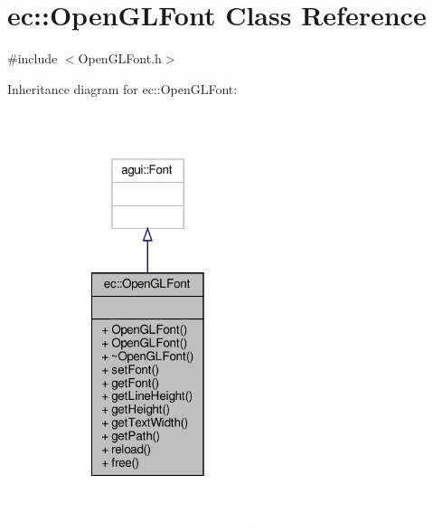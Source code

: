 \hypertarget{classec_1_1_open_g_l_font}{}\section{ec\+:\+:Open\+G\+L\+Font Class Reference}
\label{classec_1_1_open_g_l_font}


{\ttfamily \#include $<$Open\+G\+L\+Font.\+h$>$}



Inheritance diagram for ec\+:\+:Open\+G\+L\+Font\+:\nopagebreak
\begin{figure}[H]
\begin{center}
\leavevmode
\includegraphics[width=173pt]{classec_1_1_open_g_l_font__inherit__graph}
\end{center}
\end{figure}


